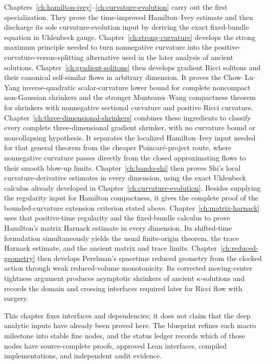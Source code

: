 \documentclass[10pt]{coll-l}
\theoremstyle{definition}
\theoremstyle{remark}
\numberwithin{section}{chapter}
\numberwithin{equation}{chapter}
\begin{document}
Chapters~\ref{ch:hamilton-ivey}--\ref{ch:curvature-evolution} carry out the
first specialization.  They prove the time-improved Hamilton--Ivey estimate
and then discharge its sole curvature-evolution input by deriving the exact
fixed-bundle equation in Uhlenbeck gauge.  Chapter~\ref{ch:strong-curvature}
develops the strong maximum principle needed to turn
nonnegative curvature into the positive-curvature-versus-splitting
alternative used in the later analysis of ancient solutions.
Chapter~\ref{ch:gradient-solitons} then develops gradient Ricci solitons and
their canonical self-similar flows in arbitrary dimension.  It proves the
Chow--Lu--Yang inverse-quadratic scalar-curvature lower bound for complete
noncompact non-Gaussian shrinkers and the stronger Munteanu--Wang
compactness theorem for shrinkers with nonnegative sectional curvature and
positive Ricci curvature.
Chapter~\ref{ch:three-dimensional-shrinkers} combines these ingredients to
classify every complete three-dimensional gradient shrinker, with no
curvature bound or noncollapsing hypothesis.  It separates the localized
Hamilton--Ivey input needed for that general theorem from the cheaper
Poincar\'e-project route, where nonnegative curvature passes directly from
the closed approximating flows to their smooth blow-up limits.
Chapter~\ref{ch:bando-shi} then proves Shi's local curvature-derivative
estimates in every dimension, using the exact Uhlenbeck calculus already
developed in Chapter~\ref{ch:curvature-evolution}.  Besides supplying the
regularity input for Hamilton compactness, it gives the complete proof of
the bounded-curvature extension criterion stated above.
Chapter~\ref{ch:matrix-harnack} uses that positive-time regularity and the
fixed-bundle calculus to prove Hamilton's matrix Harnack estimate in every
dimension.  Its shifted-time formulation simultaneously yields the usual
finite-origin theorem, the trace Harnack estimate, and the ancient matrix
and trace limits.
Chapter~\ref{ch:reduced-geometry} then develops Perelman's spacetime reduced
geometry from the clocked action through weak reduced-volume monotonicity.
Its corrected moving-center tightness argument produces asymptotic
shrinkers of ancient $\kappa$-solutions and records the domain and crossing
interfaces required later for Ricci flow with surgery.

This chapter fixes interfaces and dependencies; it does not claim that the
deep analytic inputs have already been proved here.  The blueprint refines
each macro milestone into stable fine nodes, and the status ledger records
which of those nodes have source-complete proofs, approved Lean interfaces,
compiled implementations, and independent audit evidence.
\end{document}
